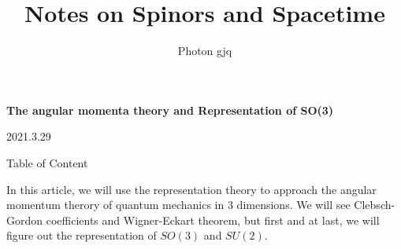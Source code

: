 \documentclass{article}
\title{Notes on Spinors and Spacetime}
\author{Photon gjq}
\begin{document}
	\maketitle
	\tableofcontents
	
	\newtheorem{definition}{Definition}
	
	\begin{center}
		\textbf{{\Large The angular momenta theory and Representation of SO(3)}}
		
		
		
		2021.3.29
		
	\end{center}
	
	Table of Content
	\begin{center}
		
	\end{center}
	In this article, we will use the representation theory to approach the angular momentum therory of quantum mechanics in $3$ dimensions. We will see Clebsch-Gordon coefficients and Wigner-Eckart theorem, but first and at last, we will figure out the representation of $SO( 3)$ and $SU( 2)$. 
	
	
	
\end{document}
